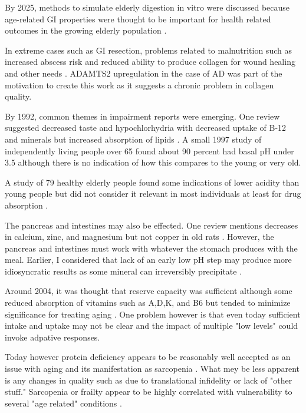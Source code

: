 By 2025, methods to simulate elderly digestion in vitro
were discussed because age-related GI properties were
thought to be important for health related outcomes
in the growing elderly population \cite{WU2025273}.


In extreme cases such as GI resection, problems related to malnutrition
such as increased abscess risk and reduced ability to produce
collagen for wound healing and other needs
\cite{xxx_Malabsorption_Syndromes_Influence_}
. ADAMTS2 upregulation in the case of AD was part of the motivation
to create this work as it suggests a chronic problem in collagen
quality. 

By 1992, common themes in impairment reports were emerging.
One review suggested decreased taste and  hypochlorhydria  
with decreased uptake of B-12 and minerals 
but increased absorption of lipids \cite{RUSSELL19921203S}.
 A small 1997  study of independently living people over 65
found about 90 percent had basal pH under 3.5 \cite{Hurwitz_Gastric_Acidity_Older_1997}
although there is no indication of how this compares to the young
or very old.

A study of 79 healthy elderly people found some indications of lower
acidity than young people but did not consider it relevant in most
individuals at least for drug absorption
\cite{Russell1993}.



The pancreas and intestines may also be effected. One review
mentions decreases in calcium, zinc, and magnesium but not copper
in old rats 
\cite{Holt_Intestinal_Malabsorption_2007}.
However, the pancreas and intestines must work with whatever
the stomach produces with the meal. Earlier, I considered that
lack of an early low pH step may produce more idiosyncratic
results as some mineral can irreversibly precipitate
\cite{marchywka-MJM-2024-010-0.01rg}.

Around 2004, it was thought that reserve capacity was sufficient
although some reduced absorption of vitamins 
such as A,D,K, and B6 but tended to minimize significance
for treating aging \cite{Dryden2004}.
One problem however is that even today sufficient intake and
uptake may not be clear and the impact of multiple "low
levels" could invoke adpative responses. 


Today however protein deficiency appears to be reasonably well
accepted as an issue with aging and its manifestation as sarcopenia
\cite{Qiu2025}. What mey be less apparent is any changes in quality
such as due to translational infidelity or lack of "other stuff."
Sarcopenia or frailty appear to be highly correlated with
vulnerability to several "age related" conditions
\cite{YE2023102111}.

